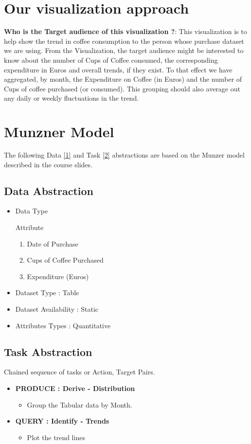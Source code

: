 \documentclass[a4paper,11pt]{article}
\begin{document}
\begin{multicols}{2}
\section*{Our visualization approach}
\textbf{Who is the Target audience of this visualization ?}: This visualization is to help show the trend in coffee consumption to the person whose purchase dataset we are using. 
From the Visualization, the target audience might be interested to know about the number of Cups of Coffee consumed, the corresponding expenditure in Euros and overall trends, if they exist.
To that effect we have aggregated, by month, the Expenditure on Coffee (in Euros) and the number of Cups of coffee purchased (or consumed). This grouping should also average out any daily or weekly fluctuations in the trend.
\section*{Munzner Model}
The following Data \ref{1} and Task \ref{2} abstractions are based on the Munzer model described in the course slides.
\subsection*{Data Abstraction}
\begin{itemize}
	\item Data Type
	\begin{itemize}
		Attribute
		\begin{enumerate}
			\item Date of Purchase 
			\item Cups of Coffee Purchased
			\item Expenditure (Euros)
		\end{enumerate} 
	\end{itemize}
	\item Dataset Type : Table
	\item Dataset Availability : Static
	\item Attributes Types : Quantitative
\end{itemize}
\subsection*{Task Abstraction}
Chained sequence of tasks or {Action, Target} Pairs.
\begin{itemize}
	\item \textbf{PRODUCE : Derive - Distribution}
	\begin{itemize}
			\item Group the Tabular data by Month. 
	\end{itemize}
	\item \textbf{QUERY : Identify - Trends}
	\begin{itemize}
		\item Plot the trend lines
	\end{itemize}
\end{itemize}

\end{multicols}
\end{document}
